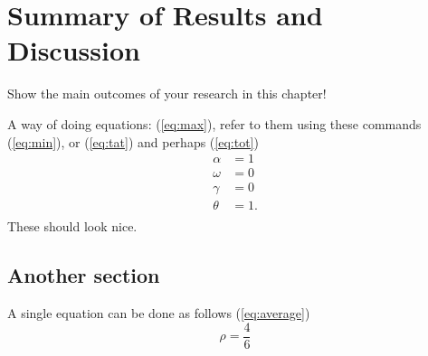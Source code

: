 \chapter{Summary of Results and Discussion\label{chap:3}}
Show the main outcomes of your research in this chapter!

\noindent A way of doing equations:
(\ref{eq:max}), refer to them using these commands (\ref{eq:min}), or (\ref{eq:tat}) and perhaps (\ref{eq:tot})
\begin{align}
	\label{eq:max}\alpha & = 1\\
	\label{eq:min}\omega & = 0\\
	\label{eq:tat}\gamma & = 0\\
	\label{eq:tot}\theta & = 1.\\
\end{align}
\noindent These should look nice.

\section{Another section}
A single equation can be done as follows (\ref{eq:average})
\begin{equation}
	\rho = \frac{4}{6}\label{eq:average}
\end{equation}
